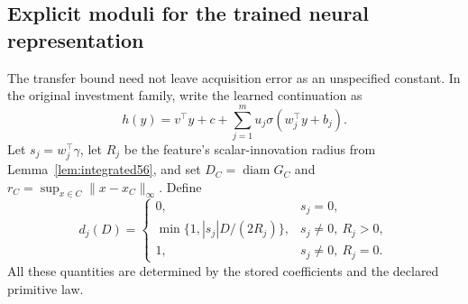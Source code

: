 \subsection{Explicit moduli for the trained neural representation}\label{sec:neural-moduli57}
The transfer bound need not leave acquisition error as an unspecified constant. In the original investment family, write the learned continuation as
\[
 h(y)=v^\top y+c+\sum_{j=1}^{m}u_j\sigma(w_j^\top y+b_j).
\]
Let $s_j=w_j^\top\gamma$, let $R_j$ be the feature's scalar-innovation radius from Lemma~\ref{lem:integrated56}, and set $D_C=\operatorname{diam}G_C$ and $r_C=\sup_{x\in C}\|x-x_C\|_\infty$. Define
\[
 d_j(D)=
 \begin{cases}
 0,&s_j=0,\\
 \min\{1,|s_j|D/(2R_j)\},&s_j\ne0,\ R_j>0,\\
 1,&s_j\ne0,\ R_j=0.
 \end{cases}
\]
All these quantities are determined by the stored coefficients and the declared primitive law.

